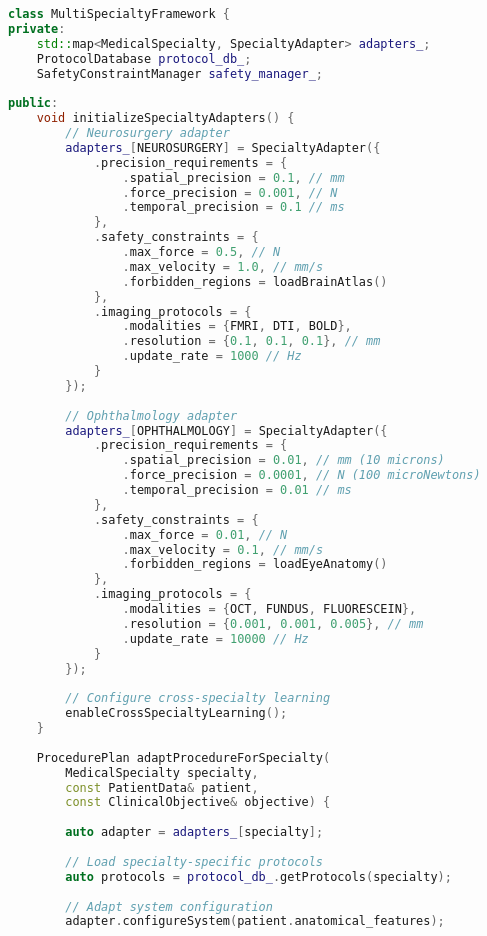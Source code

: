 \begin{lstlisting}[language=C++, caption={Multi-Specialty Adaptation Framework}, label={lst:multi-specialty}]
class MultiSpecialtyFramework {
private:
    std::map<MedicalSpecialty, SpecialtyAdapter> adapters_;
    ProtocolDatabase protocol_db_;
    SafetyConstraintManager safety_manager_;
    
public:
    void initializeSpecialtyAdapters() {
        // Neurosurgery adapter
        adapters_[NEUROSURGERY] = SpecialtyAdapter({
            .precision_requirements = {
                .spatial_precision = 0.1, // mm
                .force_precision = 0.001, // N
                .temporal_precision = 0.1 // ms
            },
            .safety_constraints = {
                .max_force = 0.5, // N
                .max_velocity = 1.0, // mm/s
                .forbidden_regions = loadBrainAtlas()
            },
            .imaging_protocols = {
                .modalities = {FMRI, DTI, BOLD},
                .resolution = {0.1, 0.1, 0.1}, // mm
                .update_rate = 1000 // Hz
            }
        });
        
        // Ophthalmology adapter
        adapters_[OPHTHALMOLOGY] = SpecialtyAdapter({
            .precision_requirements = {
                .spatial_precision = 0.01, // mm (10 microns)
                .force_precision = 0.0001, // N (100 microNewtons)
                .temporal_precision = 0.01 // ms
            },
            .safety_constraints = {
                .max_force = 0.01, // N
                .max_velocity = 0.1, // mm/s
                .forbidden_regions = loadEyeAnatomy()
            },
            .imaging_protocols = {
                .modalities = {OCT, FUNDUS, FLUORESCEIN},
                .resolution = {0.001, 0.001, 0.005}, // mm
                .update_rate = 10000 // Hz
            }
        });
        
        // Configure cross-specialty learning
        enableCrossSpecialtyLearning();
    }
    
    ProcedurePlan adaptProcedureForSpecialty(
        MedicalSpecialty specialty,
        const PatientData& patient,
        const ClinicalObjective& objective) {
        
        auto adapter = adapters_[specialty];
        
        // Load specialty-specific protocols
        auto protocols = protocol_db_.getProtocols(specialty);
        
        // Adapt system configuration
        adapter.configureSystem(patient.anatomical_features);
        

\end{lstlisting}
